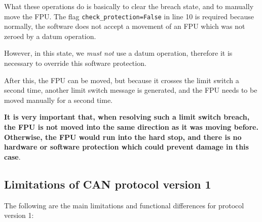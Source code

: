 \documentclass{scrartcl}[12pt,a4paper]
\begin{document}
What these operations do is basically to clear the breach state, and
to manually move the FPU.  The flag \texttt{check\_protection=False}
in line 10 is required because normally, the software does not accept
a movement of an FPU which was not zeroed by a datum operation.

However, in this state, we \emph{must not} use a datum operation,
therefore it is necessary to override this software protection.

After this, the FPU can be moved, but because it crosses
the limit switch a second time, another limit switch
message is generated, and the FPU needs to be moved
manually for a second time.

\textbf{It is very important that, when resolving such a limit switch
  breach, the FPU is not moved into the same direction as it was
  moving before.  Otherwise, the FPU would run into the hard stop, and
  there is no hardware or software protection which could prevent
  damage in this case}.


\subsection{Limitations of CAN protocol version 1}

The following are the main limitations and functional
differences for protocol version 1:
\end{document}
